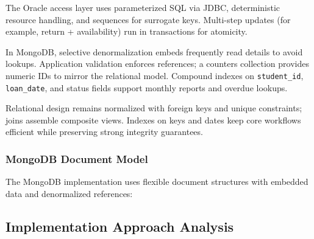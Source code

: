 \documentclass[12pt,a4paper]{article}
\begin{document}
The Oracle access layer uses parameterized SQL via JDBC, deterministic resource handling, and sequences for surrogate keys. Multi-step updates (for example, return + availability) run in transactions for atomicity.

In MongoDB, selective denormalization embeds frequently read details to avoid lookups. Application validation enforces references; a counters collection provides numeric IDs to mirror the relational model. Compound indexes on \texttt{student\_id}, \texttt{loan\_date}, and status fields support monthly reports and overdue lookups.

Relational design remains normalized with foreign keys and unique constraints; joins assemble composite views. Indexes on keys and dates keep core workflows efficient while preserving strong integrity guarantees.

\subsubsection{MongoDB Document Model}
The MongoDB implementation uses flexible document structures with embedded data and denormalized references:
\begin{comment}
\begin{lstlisting}[language=Java, caption=MongoDB Document Structures]
// Student document - self-contained with all attributes
{
  "student_id": 1,
  "name": "John Smith",
  "email": "john.smith@university.edu",
  "phone": "+44 20 7946 0958",
  "address": "123 University Street, London, UK",
  "registration_date": "2023-09-15"
}

// Book document with inventory tracking
{
  "book_id": 1,
  "title": "Introduction to Database Systems",
  "author": "C.J. Date",
  "isbn": "978-0321197849",
  "category": "Computer Science",
  "publication_year": 2019,
  "available_copies": 3,
  "total_copies": 5
}

// Loan document with denormalized references (no foreign key enforcement)
{
  "loan_id": 1,
  "student_id": 1,
  "book_id": 1,
  "loan_date": "2024-01-15",
  "due_date": "2024-01-29",
  "return_date": null,
  "status": "ACTIVE",
  "renewal_count": 0
}
\end{lstlisting}
\end{comment}

\subsection{Implementation Approach Analysis}
\end{document}
